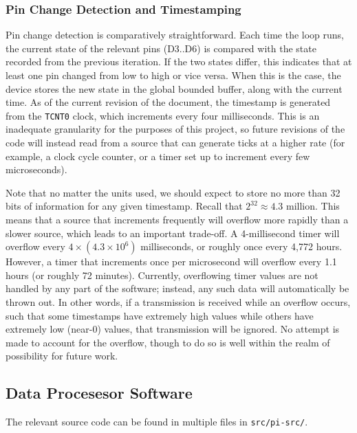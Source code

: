 \documentclass[12pt]{article}
\begin{document}
\subsubsection{Pin Change Detection and Timestamping}

Pin change detection is comparatively straightforward.
Each time the loop runs, the current state of the relevant pins (D3..D6) is
compared with the state recorded from the previous iteration.
If the two states differ, this indicates that at least one pin changed from
low to high or vice versa.
When this is the case, the device stores the new state in the global bounded
buffer, along with the current time.
As of the current revision of the document, the timestamp is generated from
the \texttt{TCNT0} clock, which increments every four milliseconds.
This is an inadequate granularity for the purposes of this project, so future
revisions of the code will instead read from a source that can generate ticks
at a higher rate (for example, a clock cycle counter, or a timer set up to
increment every few microseconds).

Note that no matter the units used, we should expect to store no more than 32
bits of information for any given timestamp.
Recall that $2^{32} \approx 4.3$ million.
This means that a source that increments frequently will overflow more rapidly
than a slower source, which leads to an important trade-off.
A 4-millisecond timer will overflow every $4\times (4.3\times 10^6)$
milliseconds, or roughly once every 4,772 hours.
However, a timer that increments once per microsecond will overflow every 1.1
hours (or roughly 72 minutes).
Currently, overflowing timer values are not handled by any part of the
software; instead, any such data will automatically be thrown out.
In other words, if a transmission is received while an overflow occurs, such
that some timestamps have extremely high values while others have extremely
low (near-0) values, that transmission will be ignored.
No attempt is made to account for the overflow, though to do so is well within
the realm of possibility for future work.

\subsection{Data Procesesor Software}

The relevant source code can be found in multiple files in
\texttt{src/pi-src/}.
\end{document}
